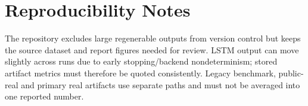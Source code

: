 \normalsize

\section{Reproducibility Notes}

The repository excludes large regenerable outputs from version control but keeps
the source dataset and report figures needed for review. LSTM output can move
slightly across runs due to early stopping/backend nondeterminism; stored artifact
metrics must therefore be quoted consistently. Legacy benchmark, public-real and primary
real artifacts use separate paths and must not be averaged into one reported
number.

